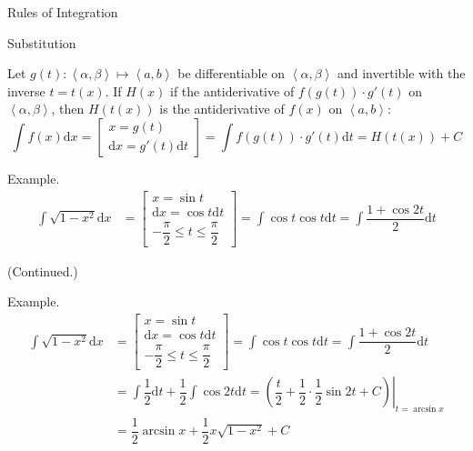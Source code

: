 \documentclass[aspectratio=169, UTF8]{ctexbeamer}
\begin{document}
    \begin{frame}[t]{Rules of Integration}
        \begin{block}{Substitution}
            \par Let $g(t): \left\langle\alpha,\beta\right\rangle\mapsto \left\langle a, b\right\rangle$ be differentiable on $\left\langle\alpha,\beta\right\rangle$ and invertible with the inverse $t = t(x)$. If $H(x)$ if the antiderivative of $f(g(t))\cdot g'(t)$ on $\left\langle\alpha,\beta\right\rangle$, then $H(t(x))$ is the antiderivative of $f(x)$ on $\left\langle a, b\right\rangle$: $$\int f(x)\mathrm{d}x = \left[\begin{array}{c}
                x = g(t) \\ \mathrm{d}x = g'(t)\mathrm{d}t
            \end{array}\right] = \int f(g(t))\cdot g'(t)\mathrm{d}t = H(t(x)) + C$$
        \end{block}
        \par \textcolor{yy}{Example.} 
        \begin{equation*}
            \begin{aligned}
                \int \sqrt{1-x^2}\mathrm{d}x & = \left[\begin{array}{c} x = \sin t\\\mathrm{d}x = \cos t \mathrm{d}t \\ -\dfrac{\pi}{2} \leqslant t \leqslant \dfrac{\pi}{2}\end{array}\right] = \int \cos t \cos t \mathrm{d}t = \int \dfrac{1+\cos 2t}{2}\mathrm{d}t
            \end{aligned}
        \end{equation*}
    \end{frame}
    \begin{frame}[t]
        \par (Continued.)
        \par \textcolor{yy}{Example.} 
        \begin{equation*}
            \begin{aligned}
                \int \sqrt{1-x^2}\mathrm{d}x & = \left[\begin{array}{c} x = \sin t\\\mathrm{d}x = \cos t \mathrm{d}t \\ -\dfrac{\pi}{2} \leqslant t \leqslant \dfrac{\pi}{2}\end{array}\right] = \int \cos t \cos t \mathrm{d}t = \int \dfrac{1+\cos 2t}{2}\mathrm{d}t \\
                & = \int \dfrac{1}{2}\mathrm{d}t + \dfrac{1}{2}\int \cos 2t \mathrm{d}t = \left.\left(\dfrac{t}{2} + \dfrac{1}{2}\cdot\dfrac{1}{2}\sin 2t + C\right)\right|_{t = \arcsin x} \\
                & = \dfrac{1}{2}\arcsin x + \dfrac{1}{2}x\sqrt{1-x^2} + C
            \end{aligned}
        \end{equation*}
    \end{frame}
\end{document}
